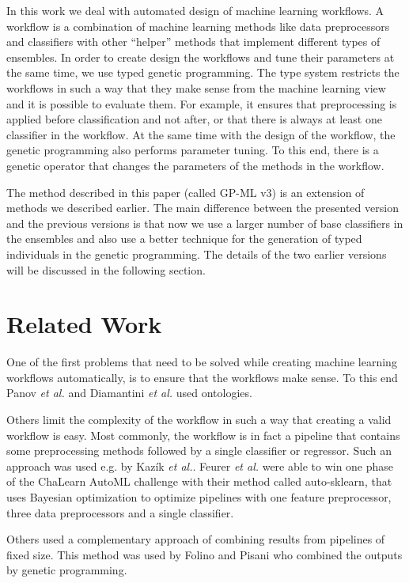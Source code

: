 \documentclass{ws-ijait}
\begin{document}
In this work we deal with automated design of machine learning workflows. A
workflow is a combination of machine learning methods like data preprocessors
and classifiers with other ``helper'' methods that implement different types of
ensembles. In order to create design the workflows and tune their parameters at
the same time, we use typed genetic programming. The type system restricts the
workflows in such a way that they make sense from the machine learning view and
it is possible to evaluate them. For example, it ensures that preprocessing is
applied before classification and not after, or that there is always at least
one classifier in the workflow. At the same time with the design of the
workflow, the genetic programming also performs parameter tuning. To this end,
there is a genetic operator that changes the parameters of the methods in the
workflow.

The method described in this paper (called GP-ML v3) is an extension of methods
we described earlier\cite{SSCI2015,7814654}. The main difference between the
presented version and the previous versions is that now we use a larger number
of base classifiers in the ensembles and also use a better technique for the
generation of typed individuals in the genetic programming. The details of the
two earlier versions will be discussed in the following section.

\section{Related Work}

One of the first problems that need to be solved while creating machine learning
workflows automatically, is to ensure that the workflows make sense. To this end
Panov \emph{et al.}\cite{4734003} and Diamantini \emph{et al.}\cite{Diamant}
used ontologies. 

Others limit the complexity of the workflow in such a way that creating a valid
workflow is easy. Most commonly, the workflow is in fact a pipeline that
contains some preprocessing methods followed by a single classifier or
regressor. Such an approach was used e.g. by Kaz\'ik \emph{et
al.}\cite{aKazikADMI14}. Feurer \emph{et al.}\cite{NIPS2015_5872} were able to
win one phase of the ChaLearn AutoML challenge\cite{7280767} with their method
called auto-sklearn, that uses Bayesian optimization to optimize pipelines with 
one feature preprocessor, three data preprocessors and a single classifier.

Others used a complementary approach of combining results from pipelines of
fixed size. This method was used by Folino and Pisani\cite{MoraaSquirel} who
combined the outputs by genetic programming.
\end{document}

